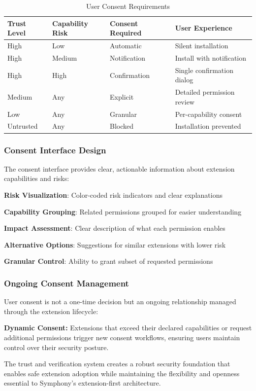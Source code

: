 \begin{table}[h]
\centering
\caption{User Consent Requirements}
\label{tab:user-consent-requirements}
\begin{tabular}{@{}llll@{}}
\toprule
\textbf{Trust Level} & \textbf{Capability Risk} & \textbf{Consent Required} & \textbf{User Experience} \\
\midrule
High & Low & Automatic & Silent installation \\
High & Medium & Notification & Install with notification \\
High & High & Confirmation & Single confirmation dialog \\
Medium & Any & Explicit & Detailed permission review \\
Low & Any & Granular & Per-capability consent \\
Untrusted & Any & Blocked & Installation prevented \\
\bottomrule
\end{tabular}
\end{table}

\subsubsection{Consent Interface Design}
\label{subsubsec:consent-interface-design}

The consent interface provides clear, actionable information about extension capabilities and risks:

\begin{compactlist}
\item \textbf{Risk Visualization}: Color-coded risk indicators and clear explanations
\item \textbf{Capability Grouping}: Related permissions grouped for easier understanding
\item \textbf{Impact Assessment}: Clear description of what each permission enables
\item \textbf{Alternative Options}: Suggestions for similar extensions with lower risk
\item \textbf{Granular Control}: Ability to grant subset of requested permissions
\end{compactlist}

\subsubsection{Ongoing Consent Management}
\label{subsubsec:ongoing-consent-management}

User consent is not a one-time decision but an ongoing relationship managed through the extension lifecycle:

\begin{alertbox}
\textbf{Dynamic Consent:} Extensions that exceed their declared capabilities or request additional permissions trigger new consent workflows, ensuring users maintain control over their security posture.
\end{alertbox}

The trust and verification system creates a robust security foundation that enables safe extension adoption while maintaining the flexibility and openness essential to Symphony's extension-first architecture.